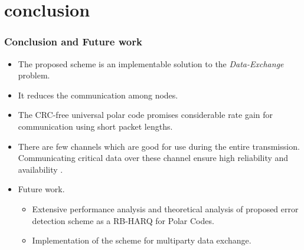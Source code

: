 \documentclass[xcolor=dvipsnames]{beamer}
\begin{document}
\section{conclusion}
\begin{frame}[label=conc]
\frametitle{Conclusion and Future work}
\begin{itemize}
\item The proposed scheme is an implementable solution to the \emph{Data-Exchange} problem.
\item It reduces the communication among nodes.
\item The CRC-free universal polar code promises considerable rate gain for communication using short packet lengths. 
\item There are few channels which are good for use during the entire transmission. Communicating critical data over these channel ensure high reliability and availability . 
\end{itemize}
\begin{itemize}
\item Future work.
\begin{itemize}
\item Extensive performance analysis and theoretical analysis of proposed error detection scheme as a RB-HARQ for Polar Codes.
\item Implementation of the scheme for multiparty data exchange.
\end{itemize}
\end{itemize}
\end{frame}

\end{document}
